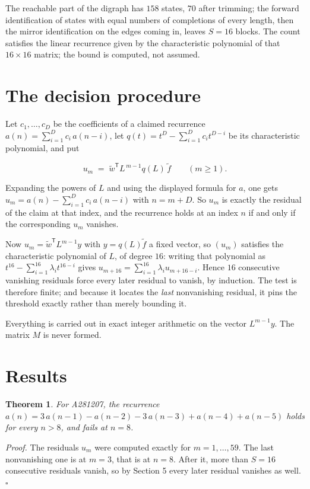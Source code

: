 \documentclass[11pt]{article}
\newtheorem{theorem}{Theorem}
\theoremstyle{definition}
\begin{document}
The reachable part of the digraph has $158$ states, $70$ after trimming; the forward identification of states with equal numbers of completions of every length, then the mirror identification on the edges coming in, leaves $S = 16$ blocks. The count satisfies the linear recurrence given by the characteristic polynomial of that $16\times16$ matrix; the bound is computed, not assumed.

\section{The decision procedure}

Let $c_1,\dots,c_D$ be the coefficients of a claimed recurrence $a(n) = \sum_{i=1}^{D} c_i\,a(n-i)$, let $q(t) = t^{D} - \sum_{i=1}^{D} c_i t^{D-i}$ be its characteristic polynomial, and put

\[u_m \;=\; \tilde w^{\mathsf T} L^{\,m-1} q(L)\,\tilde f \qquad (m \ge 1).\]

Expanding the powers of $L$ and using the displayed formula for $a$, one gets $u_m = a(n) - \sum_{i=1}^{D} c_i\,a(n-i)$ with $n = m + D$. So $u_m$ is exactly the residual of the claim at that index, and the recurrence holds at an index $n$ if and only if the corresponding $u_m$ vanishes.

Now $u_m = \tilde w^{\mathsf T} L^{m-1} y$ with $y = q(L)\tilde f$ a fixed vector, so $(u_m)$ satisfies the characteristic polynomial of $L$, of degree $16$: writing that polynomial as $t^{16} - \sum_{i=1}^{16} \lambda_i t^{16-i}$ gives $u_{m+16} = \sum_{i=1}^{16} \lambda_i u_{m+16-i}$. Hence $16$ consecutive vanishing residuals force every later residual to vanish, by induction. The test is therefore finite; and because it locates the {\itshape last} nonvanishing residual, it pins the threshold exactly rather than merely bounding it.

Everything is carried out in exact integer arithmetic on the vector $L^{m-1}y$. The matrix $M$ is never formed.

\section{Results}

\begin{theorem} For A281207, the recurrence $a(n) = 3\,a(n-1) - a(n-2) - 3\,a(n-3) + a(n-4) + a(n-5)$ holds for every $n > 8$, and fails at $n = 8$.\end{theorem}

{\itshape Proof.} The residuals $u_m$ were computed exactly for $m = 1,\dots,59$. The last nonvanishing one is at $m = 3$, that is at $n = 8$. After it, more than $S = 16$ consecutive residuals vanish, so by Section 5 every later residual vanishes as well. $\square$
\end{document}
